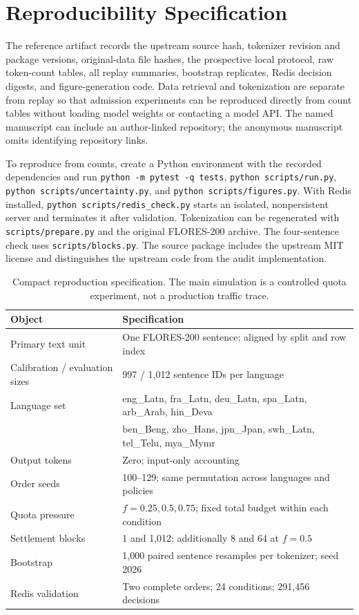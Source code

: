 \documentclass[manuscript,screen]{acmart}
\begin{document}
\clearpage


\appendix
\section{Reproducibility Specification}
The reference artifact records the upstream source hash, tokenizer revision and package versions, original-data file hashes, the prospective local protocol, raw token-count tables, all replay summaries, bootstrap replicates, Redis decision digests, and figure-generation code. Data retrieval and tokenization are separate from replay so that admission experiments can be reproduced directly from count tables without loading model weights or contacting a model API. The named manuscript can include an author-linked repository; the anonymous manuscript omits identifying repository links.

To reproduce from counts, create a Python environment with the recorded dependencies and run \texttt{python -m pytest -q tests}, \texttt{python scripts/run.py}, \texttt{python scripts/uncertainty.py}, and \texttt{python scripts/figures.py}. With Redis installed, \texttt{python scripts/redis\_check.py} starts an isolated, nonpersistent server and terminates it after validation. Tokenization can be regenerated with \texttt{scripts/prepare.py} and the original FLORES-200 archive. The four-sentence check uses \texttt{scripts/blocks.py}. The source package includes the upstream MIT license and distinguishes the upstream code from the audit implementation.

\begin{table}[h]
\centering\small
\begin{tabular}{ll}\toprule
Object & Specification\\\midrule
Primary text unit & One FLORES-200 sentence; aligned by split and row index\\
Calibration / evaluation sizes & 997 / 1,012 sentence IDs per language\\
Language set & eng\_Latn, fra\_Latn, deu\_Latn, spa\_Latn, arb\_Arab, hin\_Deva\\
 & ben\_Beng, zho\_Hans, jpn\_Jpan, swh\_Latn, tel\_Telu, mya\_Mymr\\
Output tokens & Zero; input-only accounting\\
Order seeds & 100--129; same permutation across languages and policies\\
Quota pressure & $f=0.25,0.5,0.75$; fixed total budget within each condition\\
Settlement blocks & 1 and 1,012; additionally 8 and 64 at $f=0.5$\\
Bootstrap & 1,000 paired sentence resamples per tokenizer; seed 2026\\
Redis validation & Two complete orders; 24 conditions; 291,456 decisions\\\bottomrule
\end{tabular}
\caption{Compact reproduction specification. The main simulation is a controlled quota experiment, not a production traffic trace.}
\end{table}
\end{document}
